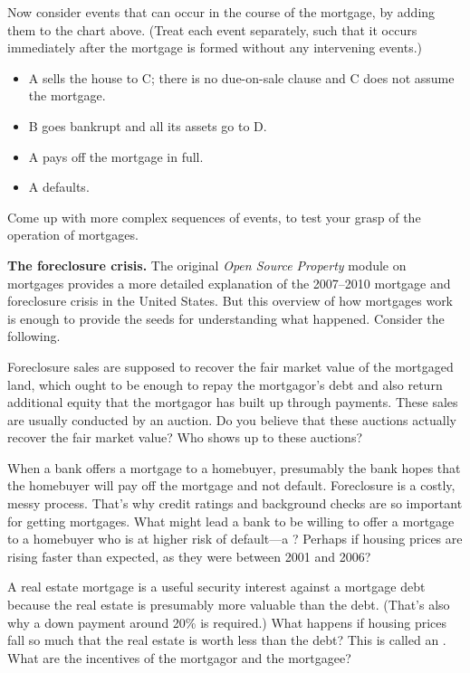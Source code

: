 Now consider events that can occur in the course of the mortgage, by adding them
to the chart above. (Treat each event separately, such that it occurs
immediately after the mortgage is formed without any intervening events.)
\begin{itemize}
\item A sells the house to C; there is no due-on-sale clause and C does not
assume the mortgage.
\item B goes bankrupt and all its assets go to D.
\item A pays off the mortgage in full.
\item A defaults.
\end{itemize}
Come up with more complex sequences of events, to test your grasp of the
operation of mortgages.

\item \textbf{The foreclosure crisis.} The original \emph{Open Source Property}
module on mortgages provides a
more detailed explanation of the 2007--2010 mortgage and foreclosure crisis in
the United States. But this overview of how mortgages work is enough to provide
the seeds for understanding what happened. Consider the following.

\item Foreclosure sales are supposed to recover the fair market value of the
mortgaged land, which ought to be enough to repay the mortgagor's debt and also
return additional equity that the mortgagor has built up through payments. These
sales are usually conducted by an auction. Do you believe that these auctions
actually recover the fair market value? Who shows up to these auctions?

\item When a bank offers a mortgage to a homebuyer, presumably the bank hopes
that the homebuyer will pay off the mortgage and not default. Foreclosure is a
costly, messy process. That's why credit ratings and background checks are so
important for getting mortgages. What might lead a bank to be willing to offer a
mortgage to a homebuyer who is at higher risk of default---a ? Perhaps if housing prices are rising faster than expected, as they
were between 2001 and 2006?

\item A real estate mortgage is a useful security interest against a mortgage
debt because the real estate is presumably more valuable than the debt. (That's
also why a down payment around 20\% is required.) What happens if housing prices
fall so much that the real estate is worth less than the debt? This is called an
. What are the incentives of the mortgagor and the
mortgagee?

